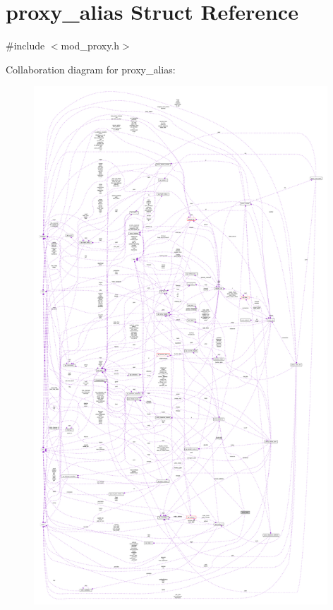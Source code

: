 \hypertarget{structproxy__alias}{}\section{proxy\+\_\+alias Struct Reference}
\label{structproxy__alias}


{\ttfamily \#include $<$mod\+\_\+proxy.\+h$>$}



Collaboration diagram for proxy\+\_\+alias\+:
\nopagebreak
\begin{figure}[H]
\begin{center}
\leavevmode
\includegraphics[height=550pt]{structproxy__alias__coll__graph}
\end{center}
\end{figure}
